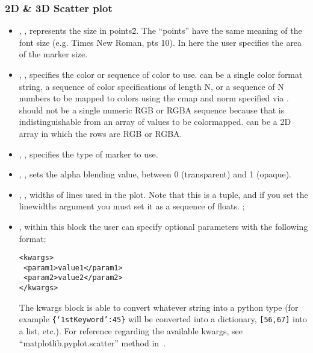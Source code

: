 \subsubsection{2D \& 3D Scatter plot}
  \begin{itemize}
    \item {}, , represents the size
    in points\^2. The ``points'' have the same meaning of the font size (e.g. Times New Roman, pts 10).
    In here the user specifies the area of the marker size.
    \item {}, , specifies the color or
    sequence of color to use.
     can be a single color format string, a sequence of color
    specifications of length N, or a sequence of N numbers to be mapped to
    colors using the cmap and norm specified via .
    \nb {} should not be a single numeric RGB or RGBA sequence because
    that is indistinguishable from an array of values to be colormapped.
     can be a 2D array in which the rows are RGB or RGBA.
    \item {}, , specifies the type
    of marker to use.
    \item {}, , sets the alpha
    blending value, between 0 (transparent) and 1 (opaque).
    \item {}, , widths of
    lines used in the plot.
    Note that this is a tuple, and if you set the linewidths argument you must
    set it as a sequence of floats.
    ;
    \item {}, within this block the user can specify optional parameters
    with the following format:

\begin{lstlisting}[style=XML]
<kwargs>
 <param1>value1</param1>
 <param2>value2</param2>
</kwargs>
\end{lstlisting}

    The kwargs block is able to convert whatever string into a python type (for
    example \texttt{\{`1stKeyword':45\}} will
    be converted into a dictionary, 
    \texttt{[56,67]} into a list, etc.).
    For reference regarding the available kwargs, see
    ``matplotlib.pyplot.scatter'' method in~\cite{MatPlotLib}.
  \end{itemize}

